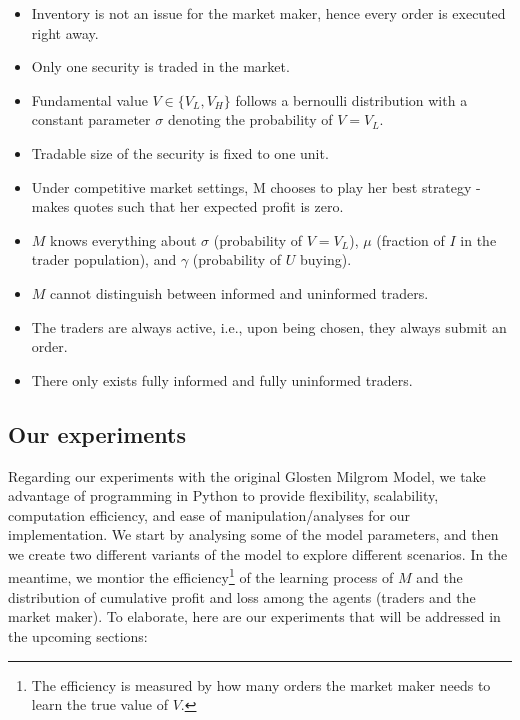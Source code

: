 \documentclass{article}
\begin{document}
\begin{itemize}
    \item Inventory is not an issue for the market maker, hence every order is executed right away.
    \item Only one security is traded in the market.
    \item Fundamental value $V \in \{V_L, V_H\}$ follows a bernoulli distribution with a constant parameter $\sigma$ denoting the probability of $V=V_L$.
    \item Tradable size of the security is fixed to one unit.
    \item Under competitive market settings, M chooses to play her best strategy - makes quotes such that her expected profit is zero.
    \item $M$ knows everything about $\sigma$ (probability of $V = V_L$), $\mu$ (fraction of $I$ in the trader population), and $\gamma$ (probability of $U$ buying).
    \item $M$ cannot distinguish between informed and uninformed traders.
    \item The traders are always active, i.e., upon being chosen, they always submit an order.
    \item There only exists fully informed and fully uninformed traders.
\end{itemize}

\subsection{Our experiments}\label{Our Experiments}
Regarding our experiments with the original Glosten Milgrom Model, we take advantage of programming in Python to provide flexibility, scalability, computation efficiency, and ease of manipulation/analyses for our implementation. We start by analysing some of the model parameters, and then we create two different variants of the model to explore different scenarios. In the meantime, we montior the efficiency\footnote{The efficiency is measured by how many orders the market maker needs to learn the true value of $V$.} of the learning process of $M$ and the distribution of cumulative profit and loss\footnotemark{} among the agents (traders and the market maker). To elaborate, here are our experiments that will be addressed in the upcoming sections:

\end{document}

